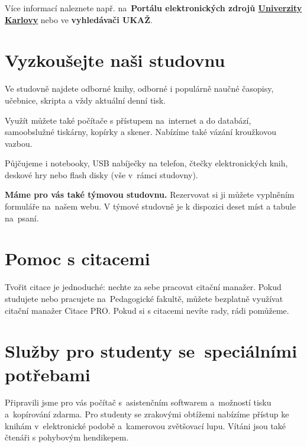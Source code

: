 Více informací naleznete např. na~\textbf{Portálu elektronických zdrojů
  {\href{https://ezdroje.cuni.cz}{Univerzity Karlovy}}} nebo ve \textbf{vyhledávači UKAŽ}.




\ikonka{\faGraduationCap}
\section{Vyzkoušejte naši studovnu}

Ve studovně najdete odborné knihy, odborné i populárně naučné
časopisy, učebnice, skripta a vždy aktuální denní tisk.

Využít můžete také počítače s přístupem na~internet a do databází,
samoobslužné tiskárny, kopírky a skener. Nabízíme také vázání kroužkovou vazbou.

Půjčujeme i notebooky, USB nabíječky na
telefon, čtečky elektronických knih, deskové hry nebo flash disky (vše
v~rámci studovny).

\textbf{Máme pro vás také týmovou studovnu.} Rezervovat si ji můžete
vyplněním formuláře na~našem webu. V týmové studovně je k dispozici deset míst
a tabule na~psaní.




\ikonka{\faAndroid}
\section{Pomoc s citacemi}

Tvořit citace je jednoduché: nechte za sebe pracovat citační manažer.
Pokud studujete nebo pracujete na~Pedagogické fakultě,
můžete bezplatně využívat citační manažer Citace PRO.
Pokud si s citacemi nevíte rady, rádi pomůžeme.

\bigskip
\ikonka{\faHeart}
\section{Služby pro studenty se~speciálními potřebami}

Připravili jsme pro vás počítač s~asistenčním softwarem
a~možností tisku a~kopírování zdarma. Pro studenty se zrakovými obtížemi
nabízíme přístup ke knihám v~elektronické podobě a~kamerovou
zvětšovací lupu. 
Vítáni jsou také čtenáři s pohybovým hendikepem.  
\newpage
